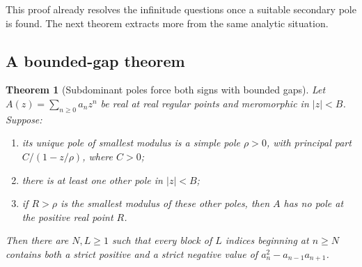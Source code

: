 \documentclass[11pt,letterpaper]{article}
\newtheorem{theorem}{Theorem}[section]
\theoremstyle{definition}
\numberwithin{equation}{section}
\begin{document}
This proof already resolves the infinitude questions once a suitable
secondary pole is found. The next theorem extracts more from the same
analytic situation.

\subsection{A bounded-gap theorem}

\begin{theorem}[Subdominant poles force both signs with bounded gaps]
\label{thm:spectral}
Let $A(z)=\sum_{n\ge0}a_nz^n$ be real at real regular points and meromorphic
in $|z|<B$. Suppose:
\begin{enumerate}[label=(\alph*)]
\item its unique pole of smallest modulus is a simple pole $\rho>0$,
with principal part $C/(1-z/\rho)$, where $C>0$;
\item there is at least one other pole in $|z|<B$;
\item if $R>\rho$ is the smallest modulus of these other poles, then
$A$ has no pole at the positive real point $R$.
\end{enumerate}
Then there are $N,L\ge1$ such that every block of $L$ indices beginning
at $n\ge N$ contains both a strict positive and a strict negative value
of $a_n^2-a_{n-1}a_{n+1}$.
\end{theorem}
\end{document}
